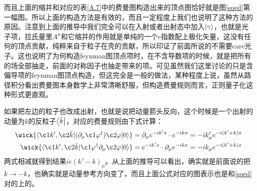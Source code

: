 而且上面的缩并和对应的表\ref{A.7}中的费曼图构造出来的顶点图恰好就是图\ref{sqed}第一幅图。所以上面的构造方法是有效的，而且一定程度上我们也说明了这种方法的原因。注意到上面的推导中我们完全可以在入射或者出射态中加入$\ket{\gamma}$，也就是光子项，拉氏量里$A^\mu$和它缩并的作用就是单纯的一个$e$指数配上极化矢量，这没有任何的顶点贡献，纯粹来自于粒子在壳的贡献，所以印证了前面所说的不需要care光子。这也说明了为何构造feynman图顶点项时，在不含导数项的时候，就是把所有的场全部抽走，前面的对称因子也抽走带来的项。可见虽然我们这里讨论的只是含偏导项的feynman图顶点构造，但这完全是一般的做法，某种程度上说，虽然从路径积分看出费曼图本身数学上非常清晰舒服，但构造费曼规则而言，正则量子化这种形式更直观。

如果把左边的粒子也改成出射，也就是说把动量箭头反向，这个时候是一个出射的动量为$k$的反粒子$\bra{\bar k}$，对应的费曼规则由下式计算：
\begin{equation}
		\begin{aligned}
			\wick{\langle \c1 k',\c2 {\bar {k}}|(\partial_\mu\c1\varphi^\dagger)\c2\varphi| 0\rangle}&=\partial_\mu e^{-ik^\prime x}\cdot{e}^{-ikx}=-ik'_\mu e^{-i(k'+k)x}\\
			\wick{\langle\c1 k',\c2{\bar k}|\c1\varphi^\dagger\partial_\mu\c2\varphi|0\rangle}
			&= e^{-ik^\prime x}\cdot\partial_\mu{e}^{-ikx}=-ik_\mu e^{-i(k'+k)x}
		\end{aligned}
\end{equation}
两式相减就得到结果$ie(k'-k)_{\mu}$。从上面的推导可以看出，确实就是前面说的把$k\to- k$，也确实就是动量参考方向变了，而且上面公式对应的图表示也是和\ref{sqed}对的上的。
